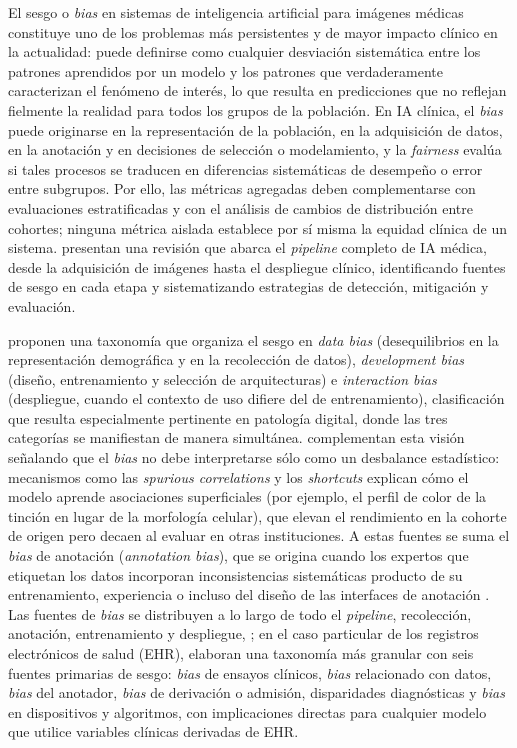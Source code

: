 El sesgo o \textit{bias} en sistemas de inteligencia artificial para imágenes médicas constituye uno de los problemas más persistentes y de mayor impacto clínico en la actualidad: puede definirse como cualquier desviación sistemática entre los patrones aprendidos por un modelo y los patrones que verdaderamente caracterizan el fenómeno de interés, lo que resulta en predicciones que no reflejan fielmente la realidad para todos los grupos de la población. En IA clínica, el \textit{bias} puede originarse en la representación de la población, en la adquisición de datos, en la anotación y en decisiones de selección o modelamiento, y la \textit{fairness} evalúa si tales procesos se traducen en diferencias sistemáticas de desempeño o error entre subgrupos. Por ello, las métricas agregadas deben complementarse con evaluaciones estratificadas y con el análisis de cambios de distribución entre cohortes; ninguna métrica aislada establece por sí misma la equidad clínica de un sistema. \textcite{ponsiglione2024} presentan una revisión que abarca el \textit{pipeline} completo de IA médica, desde la adquisición de imágenes hasta el despliegue clínico, identificando fuentes de sesgo en cada etapa y sistematizando estrategias de detección, mitigación y evaluación.

\textcite{hanna2024} proponen una taxonomía que organiza el sesgo en \textit{data bias} (desequilibrios en la representación demográfica y en la recolección de datos), \textit{development bias} (diseño, entrenamiento y selección de arquitecturas) e \textit{interaction bias} (despliegue, cuando el contexto de uso difiere del de entrenamiento), clasificación que resulta especialmente pertinente en patología digital, donde las tres categorías se manifiestan de manera simultánea. \textcite{jones2024causal} complementan esta visión señalando que el \textit{bias} no debe interpretarse sólo como un desbalance estadístico: mecanismos como las \textit{spurious correlations} y los \textit{shortcuts} explican cómo el modelo aprende asociaciones superficiales (por ejemplo, el perfil de color de la tinción en lugar de la morfología celular), que elevan el rendimiento en la cohorte de origen pero decaen al evaluar en otras instituciones. A estas fuentes se suma el \textit{bias} de anotación (\textit{annotation bias}), que se origina cuando los expertos que etiquetan los datos incorporan inconsistencias sistemáticas producto de su entrenamiento, experiencia o incluso del diseño de las interfaces de anotación \citep{onofrey2024}. Las fuentes de \textit{bias} se distribuyen a lo largo de todo el \textit{pipeline}, recolección, anotación, entrenamiento y despliegue, \citep{sahiner2023}; en el caso particular de los registros electrónicos de salud (EHR), \textcite{perets2024} elaboran una taxonomía más granular con seis fuentes primarias de sesgo: \textit{bias} de ensayos clínicos, \textit{bias} relacionado con datos, \textit{bias} del anotador, \textit{bias} de derivación o admisión, disparidades diagnósticas y \textit{bias} en dispositivos y algoritmos, con implicaciones directas para cualquier modelo que utilice variables clínicas derivadas de EHR.

